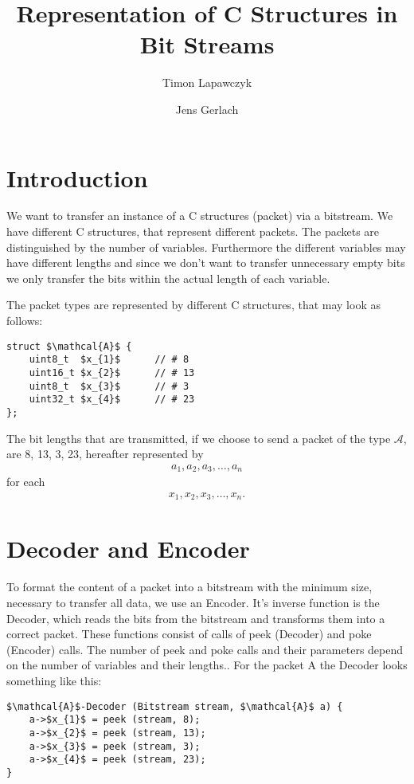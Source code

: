 \documentclass[parskip=full,paper=a4,DIV=12]{scrartcl}
\title{Representation of C Structures in Bit Streams}
\author{Timon Lapawczyk \and Jens Gerlach}
\begin{document}
\maketitle

\section{Introduction}

We want to transfer an instance of a C structures (packet) via a bitstream.
We have different C structures, that represent different packets.
The packets are distinguished by the number of variables.
Furthermore the different variables may have different lengths and
since we don't want to transfer unnecessary empty bits we only transfer
the bits within the actual length of each variable.

The packet types are represented by different C structures, that may look as follows:

\begin{lstlisting}[mathescape]
struct $\mathcal{A}$ {
	uint8_t  $x_{1}$      // # 8
	uint16_t $x_{2}$      // # 13
	uint8_t  $x_{3}$      // # 3
	uint32_t $x_{4}$      // # 23
};
\end{lstlisting}

The bit lengths that are transmitted, if we choose to send a packet of the type $\mathcal{A}$, are 8, 13, 3, 23, hereafter represented by 
\begin{align*}
	a_{1}, a_{2}, a_{3}, \ldots , a_{n}
\end{align*}
for each
\begin{align*}
	x_{1}, x_{2}, x_{3}, \ldots , x_{n}.
\end{align*}

\section{Decoder and Encoder}

To format the content of a packet into a bitstream with the minimum size, necessary to transfer all data, we use an Encoder.
It's inverse function is the Decoder, which reads the bits
from the bitstream and transforms them into a correct packet.
These functions consist of calls of peek (Decoder) and poke (Encoder) calls.
The number of peek and poke calls and their parameters depend on the number of variables and their lengths..
For the packet A the Decoder looks something like this:

\begin{lstlisting}[mathescape]
$\mathcal{A}$-Decoder (Bitstream stream, $\mathcal{A}$ a) {
	a->$x_{1}$ = peek (stream, 8);
	a->$x_{2}$ = peek (stream, 13);
	a->$x_{3}$ = peek (stream, 3);
	a->$x_{4}$ = peek (stream, 23);
}
\end{lstlisting}
\end{document}
